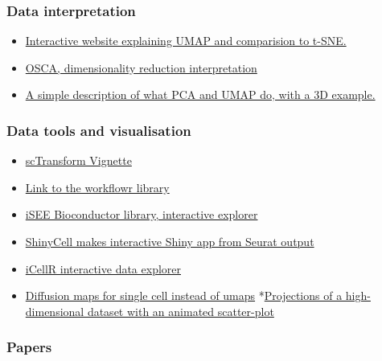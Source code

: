 \documentclass[
]{book}
\providecommand{\tightlist}{%
  \setlength{\itemsep}{0pt}\setlength{\parskip}{0pt}}
\begin{document}
\subsubsection{Data interpretation}\label{data-interpretation}

\begin{itemize}
\tightlist
\item
  \href{https://pair-code.github.io/understanding-umap/}{Interactive website explaining UMAP and comparision to t-SNE.}
\item
  \href{http://bioconductor.org/books/3.14/OSCA.basic/dimensionality-reduction.html\#visualization-interpretation}{OSCA, dimensionality reduction interpretation}
\item
  \href{https://logarithmic.net/2023/dimred.html}{A simple description of what PCA and UMAP do, with a 3D example.}
\end{itemize}

\subsubsection{Data tools and visualisation}\label{data-tools-and-visualisation}

\begin{itemize}
\tightlist
\item
  \href{https://satijalab.org/seurat/articles/sctransform_vignette.html}{scTransform Vignette}
\item
  \href{https://github.com/jdblischak/workflowr}{Link to the workflowr library}
\item
  \href{https://bioconductor.org/packages/release/bioc/html/iSEE.html}{iSEE Bioconductor library, interactive explorer}
\item
  \href{https://github.com/SGDDNB/ShinyCell}{ShinyCell makes interactive Shiny app from Seurat output}
\item
  \href{https://github.com/rezakj/iCellR}{iCellR interactive data explorer}
\item
  \href{https://www.helmholtz-munich.de/icb/research/groups/marr-lab/software/destiny/index.html}{Diffusion maps for single cell instead of umaps}
  *\href{https://logarithmic.net/langevitour/}{Projections of a high-dimensional dataset with an animated scatter-plot}
\end{itemize}

\subsubsection{Papers}\label{papers}
\end{document}
